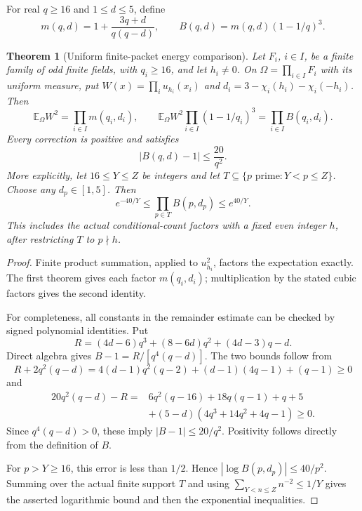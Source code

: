 \documentclass[11pt]{article}
\newtheorem{theorem}{Theorem}[section]
\begin{document}
For real \(q\geq16\) and \(1\leq d\leq5\), define
\[
 m(q,d)=1+\frac{3q+d}{q(q-d)},\qquad
 B(q,d)=m(q,d)(1-1/q)^3.
\]
\begin{theorem}[Uniform finite-packet energy comparison]
\label{thm:quadraticPacketEnergy}
Let \(F_i\), \(i\in I\), be a finite family of odd finite fields,
with \(q_i\geq16\), and let \(h_i\ne0\).
On \(\Omega=\prod_{i\in I}F_i\) with its uniform measure, put
\(W(x)=\prod_i u_{h_i}(x_i)\) and \(d_i=3-\chi_i(h_i)-\chi_i(-h_i)\).
Then
\[
 \mathbb E_\Omega W^2=\prod_{i\in I}m(q_i,d_i),\qquad
 \mathbb E_\Omega W^2\prod_{i\in I}(1-1/q_i)^3
       =\prod_{i\in I}B(q_i,d_i).
\]
Every correction is positive and satisfies
\[
                 |B(q,d)-1|\leq\frac{20}{q^2}.
\]
More explicitly, let \(16\leq Y\leq Z\) be integers and let
\(T\subseteq\{p\text{ prime}:Y<p\leq Z\}\).
Choose any \(d_p\in[1,5]\). Then
\[
 e^{-40/Y}\leq\prod_{p\in T}B(p,d_p)\leq e^{40/Y}.
\]
This includes the actual conditional-count factors with a fixed even
integer \(h\), after restricting \(T\) to \(p\nmid h\).
\end{theorem}

\begin{proof}
Finite product summation, applied to \(u_{h_i}^2\), factors the
expectation exactly. The first theorem gives each factor \(m(q_i,d_i)\);
multiplication by the stated cubic factors gives the second identity.

For completeness, all constants in the remainder estimate can be checked
by signed polynomial identities. Put
\[
 R=(4d-6)q^3+(8-6d)q^2+(4d-3)q-d.
\]
Direct algebra gives \(B-1=R/[q^4(q-d)]\). The two bounds follow from
\[
 R+2q^2(q-d)
   =4(d-1)q^2(q-2)+(d-1)(4q-1)+(q-1)\geq0
\]
and
\[
\begin{split}
 20q^2(q-d)-R={}&6q^2(q-16)+18q(q-1)+q+5\\
       &+(5-d)(4q^3+14q^2+4q-1)\geq0.
\end{split}
\]
Since \(q^4(q-d)>0\), these imply \(|B-1|\leq20/q^2\).
Positivity follows directly from the definition of \(B\).

For \(p>Y\geq16\), this error is less than \(1/2\).
Hence \(|\log B(p,d_p)|\leq40/p^2\). Summing over the actual
finite support \(T\) and using
\(\sum_{Y<n\leq Z}n^{-2}\leq1/Y\) gives the asserted
logarithmic bound and then the exponential inequalities.
\end{proof}
\end{document}
